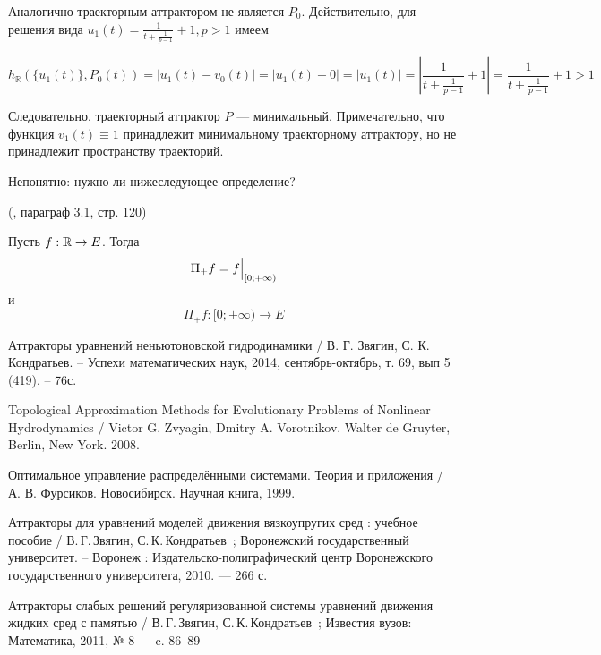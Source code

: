 Аналогично траекторным аттрактором не является $P_0$.
Действительно, для решения вида $u_1(t)=\frac{1}{t+\frac{1}{p-1}}+1, p > 1$ имеем

\begin{equation}
	h_{\mathbb{R}}(\{u_1(t)\},P_0(t)) =
	|u_1(t) - v_0(t)| =
	|u_1(t) - 0| =
	|u_1(t)| =
	\left| \frac{1}{t+\frac{1}{p-1}}+1 \right| =
	\frac{1}{t+\frac{1}{p-1}}+1 >	1
\end{equation}

Следовательно, траекторный аттрактор $P$ --- минимальный.
Примечательно, что функция $v_1(t) \equiv 1$ принадлежит минимальному траекторному аттрактору, но не принадлежит пространству траекторий.


Непонятно: нужно ли нижеследующее определение?

\opred (\cite{Zelenaya}, параграф 3.1, стр. 120)

Пусть $f:\mathbb{R}\to E$.
Тогда
$$
	\Pi_+f = \Bigl. f \Bigr|_{[0;+\infty)}
$$
и
$$
	\Pi_+f:[0; +\infty) \to E
$$


\begin{thebibliography}{99}

 Аттракторы уравнений неньютоновской гидродинамики / В. Г. Звягин, С. К. Кондратьев. – Успехи математических наук, 2014, сентябрь-октябрь, т. 69, вып 5 (419). – 76с.

 Topological Approximation Methods for Evolutionary Problems of Nonlinear Hydrodynamics / Victor G. Zvyagin, Dmitry A. Vorotnikov. Walter de Gruyter, Berlin, New York. 2008.

 Оптимальное управление распределёнными системами. Теория и приложения / А. В. Фурсиков. Новосибирск. Научная книга, 1999.

 Аттракторы для уравнений моделей движения вязкоупругих сред : учебное пособие / В.\,Г.\,Звягин, С.\,К.\,Кондратьев~; Воронежский государственный университет. -- Воронеж : Издательско-полиграфический центр Воронежского государственного университета, 2010. --- 266 с.

 Аттракторы слабых решений регуляризованной системы уравнений движения жидких сред с памятью / В.\,Г.\,Звягин, С.\,К.\,Кондратьев~; Известия вузов: Математика, 2011, № 8 --- c. 86–89

\end{thebibliography}


